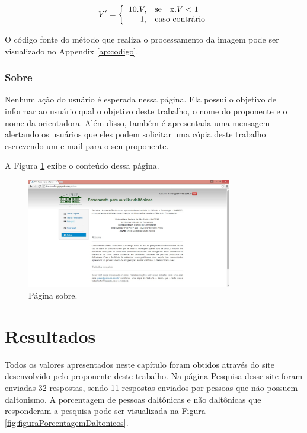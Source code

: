 \documentclass[	12pt, Times, openright, twoside, a4paper, english, brazil]{abntex2}
\begin{document}
\begin{equation}
\label{eq:exemploV}
V'=\left\{
\begin{array}{rl}
       10 . V,&\mbox{se}\quad $x$ . V < 1 \\
       1,&\mbox{caso contrário}
\end{array}\right.
\end{equation}


O código fonte do método que realiza o processamento da imagem pode ser visualizado no Appendix \ref{ap:codigo}.


\subsection{Sobre}

Nenhum ação do usuário é esperada nessa página. Ela possui o objetivo de informar ao usuário qual o objetivo deste trabalho, o nome do proponente e o nome da orientadora. Além disso, também é apresentada uma mensagem alertando os usuários que eles podem solicitar uma cópia deste trabalho escrevendo um e-mail para o seu proponente.

A Figura \ref{fig:figuraSobre} exibe o conteúdo dessa página.

\begin{figure}[!htb]
\centering \includegraphics[width=0.8\textwidth]{telaSobre.jpg}
\caption{Página sobre.} \label{fig:figuraSobre}
\end{figure}

\chapter{Resultados}
\label{cap:resultados}

Todos os valores apresentados neste capítulo foram obtidos através do site desenvolvido pelo proponente deste trabalho. Na página Pesquisa desse site foram enviadas 32 respostas, sendo 11 respostas enviados por pessoas que não possuem daltonismo. A porcentagem de pessoas daltônicas e não daltônicas que responderam a pesquisa pode ser visualizada na Figura \ref{fig:figuraPorcentagemDaltonicos}.
\end{document}
